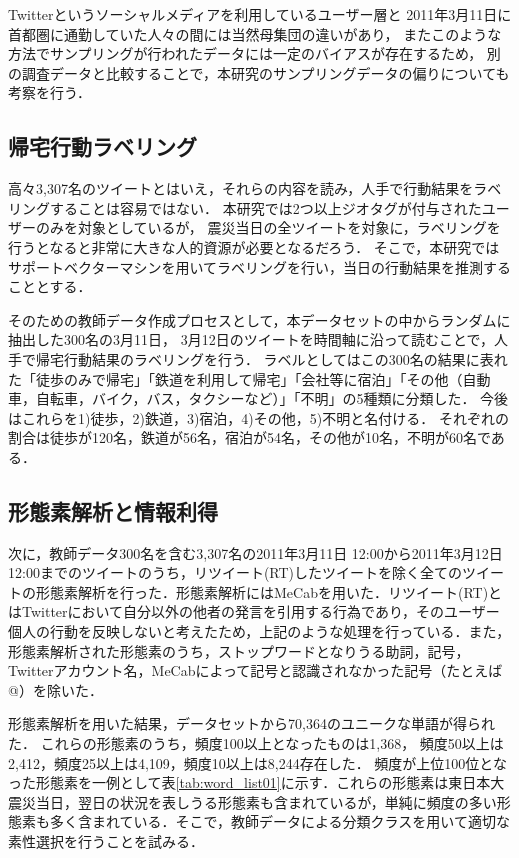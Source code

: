 \documentclass[japanese]{jnlp_1.4}
\begin{document}
Twitterというソーシャルメディアを利用しているユーザー層と
2011年3月11日に首都圏に通勤していた人々の間には当然母集団の違いがあり，
またこのような方法でサンプリングが行われたデータには一定のバイアスが存在するため，
別の調査データと比較することで，本研究のサンプリングデータの偏りについても考察を行う．


\subsection{帰宅行動ラベリング}

高々3,307名のツイートとはいえ，それらの内容を読み，人手で行動結果をラベリングすることは容易ではない．
本研究では2つ以上ジオタグが付与されたユーザーのみを対象としているが，
震災当日の全ツイートを対象に，ラベリングを行うとなると非常に大きな人的資源が必要となるだろう．
そこで，本研究ではサポートベクターマシンを用いてラベリングを行い，当日の行動結果を推測することとする．

そのための教師データ作成プロセスとして，本データセットの中からランダムに抽出した300名の3月11日，
3月12日のツイートを時間軸に沿って読むことで，人手で帰宅行動結果のラベリングを行う．
ラベルとしてはこの300名の結果に表れた「徒歩のみで帰宅」「鉄道を利用して帰宅」「会社等に宿泊」「その他（自動車，自転車，バイク，バス，タクシーなど）」「不明」の5種類に分類した．
今後はこれらを1)徒歩，2)鉄道，3)宿泊，4)その他，5)不明と名付ける．
それぞれの割合は徒歩が120名，鉄道が56名，宿泊が54名，その他が10名，不明が60名である．


\subsection{形態素解析と情報利得}

次に，教師データ300名を含む3,307名の2011年3月11日 12:00から2011年3月12日 12:00までのツイートのうち，リツイート(RT)したツイートを除く全てのツイートの形態素解析を行った．形態素解析にはMeCabを用いた．リツイート(RT)とはTwitterにおいて自分以外の他者の発言を引用する行為であり，そのユーザー個人の行動を反映しないと考えたため，上記のような処理を行っている．また，形態素解析された形態素のうち，ストップワードとなりうる助詞，記号，Twitterアカウント名，MeCabによって記号と認識されなかった記号（たとえば@）を除いた．

形態素解析を用いた結果，データセットから70,364のユニークな単語が得られた．
これらの形態素のうち，頻度100以上となったものは1,368，
頻度50以上は2,412，頻度25以上は4,109，頻度10以上は8,244存在した．
頻度が上位100位となった形態素を一例として表\ref{tab:word_list01}に示す．これらの形態素は東日本大震災当日，翌日の状況を表しうる形態素も含まれているが，単純に頻度の多い形態素も多く含まれている．そこで，教師データによる分類クラスを用いて適切な素性選択を行うことを試みる．
\end{document}
